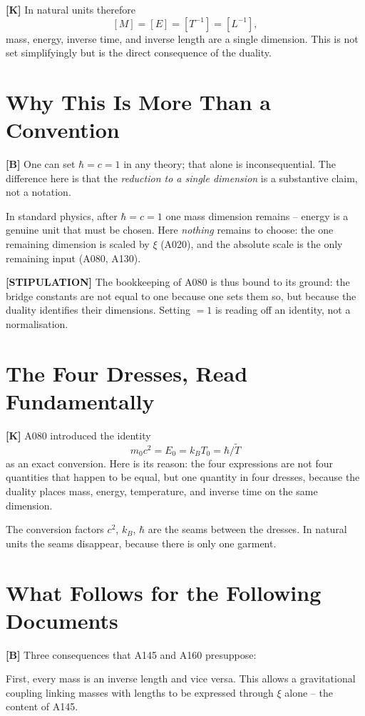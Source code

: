 \textbf{[K]} In natural units therefore
\[
  [M] = [E] = [T^{-1}] = [L^{-1}],
\]
mass, energy, inverse time, and inverse length are a single dimension. This is
not set simplifyingly but is the direct consequence of the duality.

\section{Why This Is More Than a Convention}

\textbf{[B]} One can set $\hbar = c = 1$ in any theory; that alone is
inconsequential. The difference here is that the \emph{reduction to a single
dimension} is a substantive claim, not a notation.

In standard physics, after $\hbar = c = 1$ one mass dimension remains -- energy
is a genuine unit that must be chosen. Here \emph{nothing} remains to choose:
the one remaining dimension is scaled by $\xi$ (A020), and the absolute scale
is the only remaining input (A080, A130).

\textbf{[STIPULATION]} The bookkeeping of A080 is thus bound to its ground:
the bridge constants are not equal to one because one sets them so, but because
the duality identifies their dimensions. Setting $=1$ is reading off an identity,
not a normalisation.

\section{The Four Dresses, Read Fundamentally}

\textbf{[K]} A080 introduced the identity
\[
  m_0 c^2 = E_0 = k_B T_0 = \hbar/\tilde T
\]
as an exact conversion. Here is its reason: the four expressions are not four
quantities that happen to be equal, but one quantity in four dresses, because
the duality places mass, energy, temperature, and inverse time on the same
dimension.

The conversion factors $c^2$, $k_B$, $\hbar$ are the seams between the dresses.
In natural units the seams disappear, because there is only one garment.

\section{What Follows for the Following Documents}

\textbf{[B]} Three consequences that A145 and A160 presuppose:

First, every mass is an inverse length and vice versa. This allows a
gravitational coupling linking masses with lengths to be expressed through $\xi$
alone -- the content of A145.

